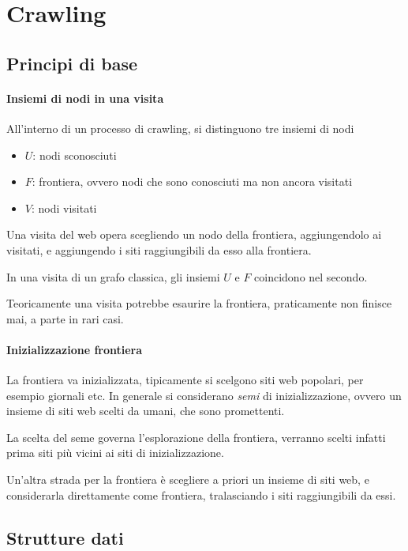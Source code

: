 \section{Crawling}

\subsection{Principi di base}

\paragraph{Insiemi di nodi in una visita}
All'interno di un processo di crawling, si distinguono 
tre insiemi di nodi 
\begin{itemize}
    \item $U$: nodi sconosciuti 
    \item $F$: frontiera, ovvero nodi che sono conosciuti ma non ancora visitati
    \item $V$: nodi visitati
\end{itemize}
Una visita del web opera scegliendo un nodo della frontiera, 
aggiungendolo ai visitati, e aggiungendo i siti raggiungibili da esso alla frontiera.

In una visita di un grafo classica, gli insiemi $U$ e $F$ coincidono nel secondo.
\begin{remark}
    Teoricamente una visita potrebbe esaurire la frontiera, 
    praticamente non finisce mai, a parte in rari casi.
\end{remark}

\paragraph{Inizializzazione frontiera}
La frontiera va inizializzata, tipicamente si scelgono siti web popolari, 
per esempio giornali etc. In generale si considerano \emph{semi} di inizializzazione, 
ovvero un insieme di siti web scelti da umani, che sono promettenti.

La scelta del seme governa l'esplorazione della frontiera, 
verranno scelti infatti prima siti più vicini ai siti di inizializzazione.

Un'altra strada per la frontiera è scegliere a priori un insieme di siti 
web, e considerarla direttamente come frontiera, tralasciando i siti 
raggiungibili da essi. 

\subsection{Strutture dati}

